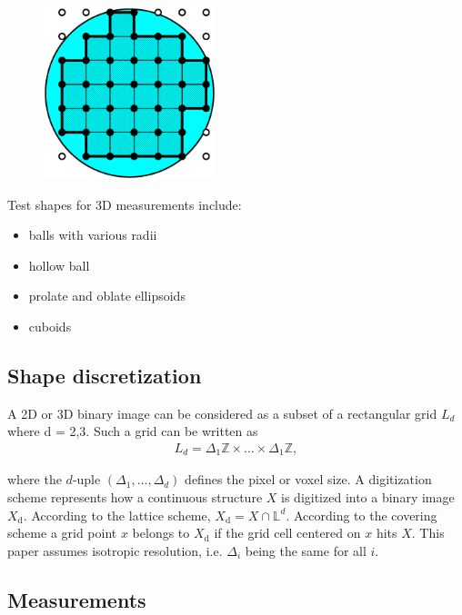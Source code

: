 \documentclass{InsightArticle}
\begin{document}
\begin{figure}[!htb]
\begin{center}
\includegraphics[width=5cm]{images/discreteDisk}
\end{center}
\end{figure}

Test shapes for 3D measurements include:
\begin{itemize}
\item balls with various radii
\item hollow ball
\item prolate and oblate ellipsoids
\item cuboids
\end{itemize}

\subsection{Shape discretization}

A 2D or 3D binary image can be considered as a subset of a rectangular grid $L_d$ where
d = 2,3. Such a grid can be written as
\begin{eqnarray}
L_d = \Delta_{1} \mathbb{Z} \times \ldots \times \Delta_{1} \mathbb{Z},
\end{eqnarray}

where the $d$-uple $(\Delta_{1},\ldots,\Delta_{d})$ defines the pixel
or voxel size. A digitization scheme represents how a continuous
structure $X$ is digitized into a binary image $X_\text{d}$. According to
the lattice scheme, $X_\text{d} = X\cap\mathbb{L}^d$. According to the
covering scheme a grid point $x$ belongs to $X_\text{d}$ if the grid
cell centered on $x$ hits $X$. 
This paper assumes isotropic resolution, i.e. $\Delta_{i}$ being the same for all $i$.

\subsection{Measurements}
\end{document}
